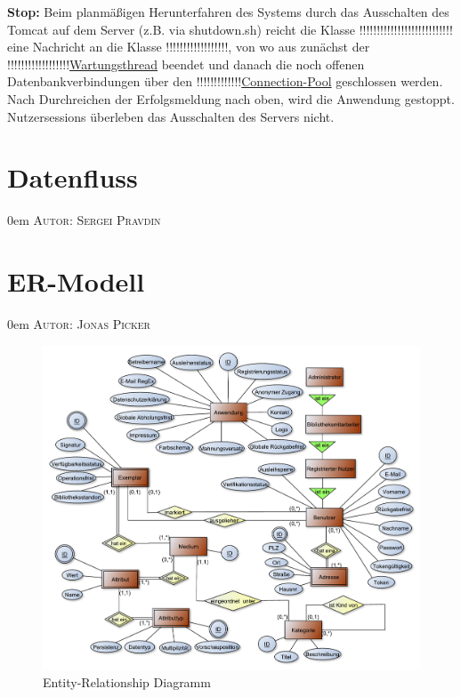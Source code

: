 \documentclass{article}
\makeatletter
\newcommand{\sectionauthor}[1]{
	{\parindent 0em \large \scshape Autor: #1 \par \nobreak \vspace*{1em}}
	\@afterheading
}
\makeatother
\begin{document}
\textbf{Stop:} 
Beim planmäßigen Herunterfahren des Systems durch das Ausschalten des Tomcat auf dem Server (z.B. via shutdown.sh) reicht die Klasse !!!!!!!!!!!!!!!!!!!!!!!!!!!\hyperlink{}{} eine Nachricht an die Klasse !!!!!!!!!!!!!!!!!!\hyperlink{}{}, von wo aus zunächst der !!!!!!!!!!!!!!!!!!\hyperlink{}{Wartungsthread} beendet und danach die noch offenen Datenbankverbindungen über den !!!!!!!!!!!!!\hyperlink{}{Connection-Pool} geschlossen werden. Nach Durchreichen der Erfolgsmeldung nach oben, wird die Anwendung gestoppt. Nutzersessions überleben das Ausschalten des Servers nicht.
\section{Datenfluss}
\sectionauthor{Sergei Pravdin}

\section{ER-Modell}
\sectionauthor{Jonas Picker}


\begin{figure}[h]
    \hypertarget{ERDia}{}
    \centering
    \includegraphics[angle = 270, width = 60em]{ER-Diagramm}
    \caption{Entity-Relationship Diagramm}
    \label{ER-Diagramm}
\end{figure}
\end{document}
